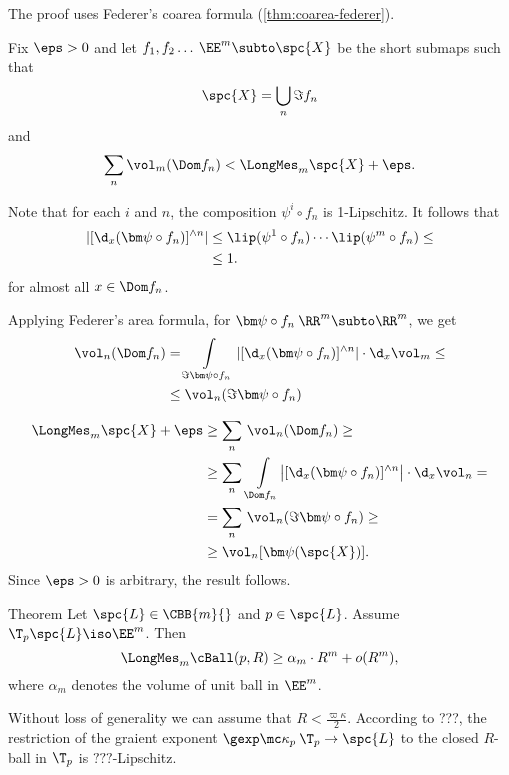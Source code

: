 The proof uses Federer's coarea formula (\ref{thm:coarea-federer}). 

Fix $\eps>0$ and let
$f_1,f_2\dots\:\EE^m\subto \spc{X}$
be the short submaps such that 
\[\spc{X}=\bigcup_n\Im f_n\]
and 
\[\sum_n\vol_m(\Dom f_n)
<
\LongMes_m \spc{X}+\eps.\]

Note that for each $i$ and $n$,
the composition $\psi^i\circ f_n$ is 1-Lipschitz.
It follows that
\begin{align*}
|[\d_x(\bm\psi\circ f_n)]^{\wedge n}|
&\le \lip(\psi^1\circ f_n)\cdots\lip(\psi^m\circ f_n)
\le
\\
&
\le 1.
\end{align*}
for almost all $x\in\Dom f_n$.


Applying Federer's area formula,
for 
$\bm\psi\circ f_n\:\RR^m\subto\RR^m$, 
we get 
\begin{align*}\vol_n(\Dom f_n)
&=
\int\limits_{\Im \bm\psi\circ f_n}|[\d_x(\bm\psi\circ f_n)]^{\wedge n}|\cdot\d_x\vol_m\le
\\
&\le \vol_n(\Im \bm\psi\circ f_n)
\end{align*}

\begin{align*}
\LongMes_m \spc{X}+\eps
&\ge \sum_n\,\vol_n(\Dom f_n)\ge
\\
&\ge \sum_n\,\int\limits_{\Dom f_n}\bigl|[\d_x(\bm\psi\circ f_n)]^{\wedge n}\bigr|\cdot\d_x\vol_n=
\\
&=\sum_n\,\vol_n(\Im \bm\psi\circ f_n)\ge
\\
&\ge \vol_n[\bm\psi(\spc{X})].
\end{align*}
Since $\eps>0$ is arbitrary, 
the result follows.
\qeds


















\begin{thm}{Theorem}
Let $\spc{L}\in\CBB{m}{}$ and $p\in \spc{L}$.
Assume $\T_p\spc{L}\iso\EE^m$.
Then 
$$\LongMes_m\cBall(p,R)\ge\alpha_m\cdot R^m+o(R^m),$$
where $\alpha_m$ denotes the volume of unit ball in $\EE^m$.
\end{thm}

Without loss of generality we can assume that $R<\tfrac{\varpi\kappa}2$.
According to ???, the restriction of the graient exponent 
$\gexp\mc\kappa_p\:\T_p\to \spc{L}$ 
to the closed $R$-ball in $\T_p$
is $???$-Lipschitz.

